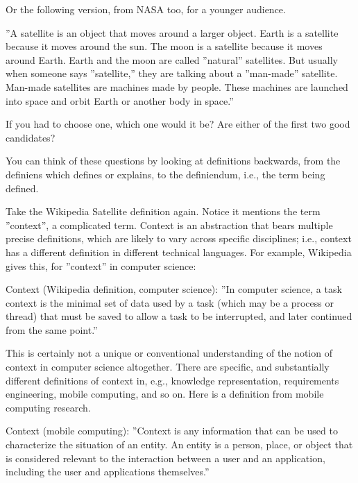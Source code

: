 Or the following version, from NASA too, for a younger audience.

\begin{svgraybox}
''A satellite is an object that moves around a larger object. Earth is a satellite because it moves around the sun. The moon is a satellite because it moves around Earth. Earth and the moon are called ''natural'' satellites. But usually when someone says ''satellite,'' they are talking about a ''man-made'' satellite. Man-made satellites are machines made by people. These machines are launched into space and orbit Earth or another body in space.'' \cite{nasa-satellite-k4}
\end{svgraybox}

If you had to choose one, which one would it be? Are either of the first two good candidates?

You can think of these questions by looking at definitions backwards, from the definiens which defines or explains, to the definiendum, i.e., the term being defined.

Take the Wikipedia Satellite definition again. Notice it mentions the term ''context'', a complicated term. Context is an abstraction that bears multiple precise definitions, which are likely to vary across specific disciplines; i.e., context has a different definition in different technical languages. For example, Wikipedia gives this, for ''context'' in computer science:

\begin{svgraybox}
Context (Wikipedia definition, computer science): ''In computer science, a task context is the minimal set of data used by a task (which may be a process or thread) that must be saved to allow a task to be interrupted, and later continued from the same point.'' \cite{wikipedia-context-computing}
\end{svgraybox}

This is certainly not a unique or conventional understanding of the notion of context in computer science altogether. There are specific, and substantially different definitions of context in, e.g., knowledge representation, requirements engineering, mobile computing, and so on. Here is a definition from mobile computing research.

\begin{svgraybox}
Context (mobile computing): ''Context is any information that can be used to characterize the situation of an entity. An entity is a person, place, or object that is considered relevant to the interaction between a user and an application, including the user and applications themselves.'' \cite{abowd1999towards}
\end{svgraybox}

